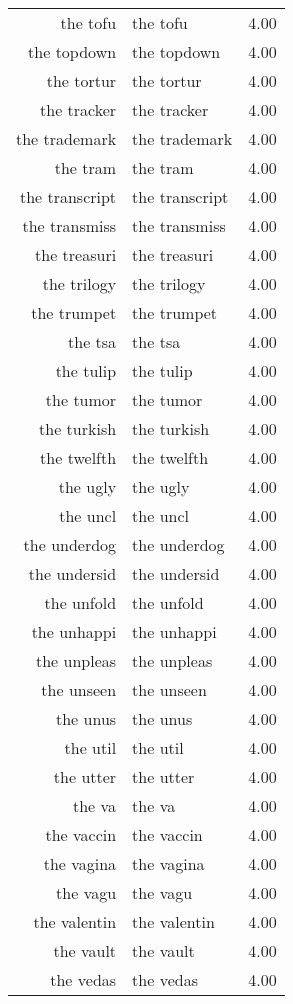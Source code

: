 \begin{table}[ht]
\begin{tabular}{rlr}
  the tofu & the tofu & 4.00 \\ 
  the topdown & the topdown & 4.00 \\ 
  the tortur & the tortur & 4.00 \\ 
  the tracker & the tracker & 4.00 \\ 
  the trademark & the trademark & 4.00 \\ 
  the tram & the tram & 4.00 \\ 
  the transcript & the transcript & 4.00 \\ 
  the transmiss & the transmiss & 4.00 \\ 
  the treasuri & the treasuri & 4.00 \\ 
  the trilogy & the trilogy & 4.00 \\ 
  the trumpet & the trumpet & 4.00 \\ 
  the tsa & the tsa & 4.00 \\ 
  the tulip & the tulip & 4.00 \\ 
  the tumor & the tumor & 4.00 \\ 
  the turkish & the turkish & 4.00 \\ 
  the twelfth & the twelfth & 4.00 \\ 
  the ugly & the ugly & 4.00 \\ 
  the uncl & the uncl & 4.00 \\ 
  the underdog & the underdog & 4.00 \\ 
  the undersid & the undersid & 4.00 \\ 
  the unfold & the unfold & 4.00 \\ 
  the unhappi & the unhappi & 4.00 \\ 
  the unpleas & the unpleas & 4.00 \\ 
  the unseen & the unseen & 4.00 \\ 
  the unus & the unus & 4.00 \\ 
  the util & the util & 4.00 \\ 
  the utter & the utter & 4.00 \\ 
  the va & the va & 4.00 \\ 
  the vaccin & the vaccin & 4.00 \\ 
  the vagina & the vagina & 4.00 \\ 
  the vagu & the vagu & 4.00 \\ 
  the valentin & the valentin & 4.00 \\ 
  the vault & the vault & 4.00 \\ 
  the vedas & the vedas & 4.00 \\ 

\end{tabular}
\end{table}
